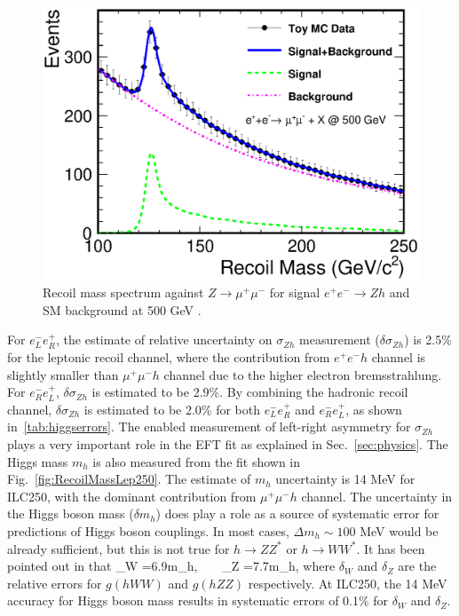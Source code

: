 \begin{figure}
\begin{center}
\includegraphics[width=0.85\hsize]{chapters/figures/RecoilMassLep500.eps}
\end{center}
  \caption{Recoil mass spectrum against
 $Z\to\mu^+\mu^-$ for signal $e^+e^-\to Zh$ and SM background 
  at 500 GeV \cite{Yan:2016xyx}.}
  \label{fig:RecoilMassLep500}
\end{figure}

For $e^-_Le^+_R$, the estimate of relative 
uncertainty on $\sigma_{Zh}$ measurement ($\delta\sigma_{Zh}$) 
is 2.5\% for the leptonic
recoil channel, where the contribution from $e^+e^-h$ channel is
slightly smaller than $\mu^+\mu^-h$ channel due to the higher 
electron bremsstrahlung. For $e^-_Re^+_L$, $\delta\sigma_{Zh}$
is estimated to be 2.9\%. By combining the hadronic recoil channel,
$\delta\sigma_{Zh}$  is estimated to be 2.0\% for both $e^-_Le^+_R$
and $e^-_Re^+_L$, as shown in~\ref{tab:higgserrors}. 
The enabled measurement of left-right asymmetry 
for $\sigma_{Zh}$ plays a very important role in the EFT fit as
explained in Sec.~\ref{sec:physics}. 
The Higgs mass $m_h$ is also measured from the fit shown
in Fig.~\ref{fig:RecoilMassLep250}. The estimate of $m_h$ uncertainty 
is 14 MeV for ILC250, with the dominant contribution 
from $\mu^+\mu^-h$ channel. 
The uncertainty in the Higgs boson mass ($\delta m_h$) does play a role 
as a source of systematic error for predictions of Higgs boson couplings. 
In most cases, $\Delta m_h\sim 100$ MeV 
would be already sufficient, but this is not true
for $h\to ZZ^*$ or $h\to WW^*$. 
It has been pointed out in  \cite{Lepage:2014fla} that 
\beq
\delta_W =6.9\cdot\delta m_h,~~~~\delta_Z =7.7\cdot \delta m_h,
where $\delta_W$ and $\delta_Z$ are the 
relative errors for $g(hWW)$ and $g(hZZ)$ respectively. 
At ILC250, the 14 MeV accuracy for Higgs boson mass results in 
systematic errors of 0.1\% for $\delta_W$ and
$\delta_Z$.



